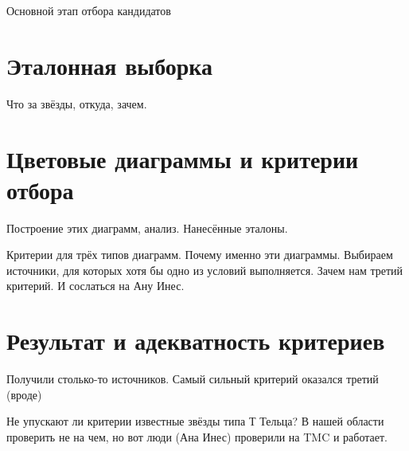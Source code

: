 Основной этап отбора кандидатов

\section{Эталонная выборка}
Что за звёзды, откуда, зачем.

\section{Цветовые диаграммы и критерии отбора}
Построение этих диаграмм, анализ. Нанесённые эталоны.

Критерии для трёх типов диаграмм. Почему именно эти диаграммы. Выбираем источники, для которых хотя бы одно из условий выполняется. Зачем нам третий критерий. И сослаться на Ану Инес.

\section{Результат и адекватность критериев}
Получили столько-то источников. Самый сильный критерий оказался третий (вроде)

Не упускают ли критерии известные звёзды типа Т Тельца? В нашей области проверить не на чем, но вот люди (Ана Инес) проверили на TMC и работает.
